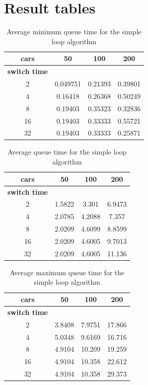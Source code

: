 \documentclass[a4paper,11pt]{article}
\begin{document}




\appendix
\section{Result tables}\label{app:rtables}

\begin{table}[htb]
\centering
\begin{tabular}{cccc}
\hline
\textbf{cars} & 50 & 100 & 200\\
\hline
\textbf{switch time} & & & \\
2 & 0.049751 & 0.21393 & 0.39801 \\
4 & 0.16418 & 0.26368 & 0.50249 \\
8 & 0.19403 & 0.35323 & 0.32836 \\
16 & 0.19403 & 0.33333 & 0.55721 \\
32 & 0.19403 & 0.33333 & 0.25871 \\
\hline
\end{tabular}
\caption{Average minimum queue time for the simple loop algorithm}
\end{table}

\begin{table}[htb]
\centering
\begin{tabular}{cccc}
\hline
\textbf{cars} & 50 & 100 & 200\\
\hline
\textbf{switch time} & & & \\
2 & 1.5822 & 3.301 & 6.9473 \\
4 & 2.0785 & 4.2088 & 7.357 \\
8 & 2.0209 & 4.6099 & 8.8599 \\
16 & 2.0209 & 4.6005 & 9.7013 \\
32 & 2.0209 & 4.6005 & 11.136 \\
\hline
\end{tabular}
\caption{Average queue time for the simple loop algorithm}
\end{table}

\begin{table}[htb]
\centering
\begin{tabular}{cccc}
\hline
\textbf{cars} & 50 & 100 & 200\\
\hline
\textbf{switch time} & & & \\
2 & 3.8408 & 7.9751 & 17.866 \\
4 & 5.0348 & 9.6169 & 16.716 \\
8 & 4.9104 & 10.209 & 19.259 \\
16 & 4.9104 & 10.358 & 22.612 \\
32 & 4.9104 & 10.358 & 29.373 \\
\hline
\end{tabular}
\caption{Average maximum queue time for the simple loop algorithm}
\end{table}
\end{document}
